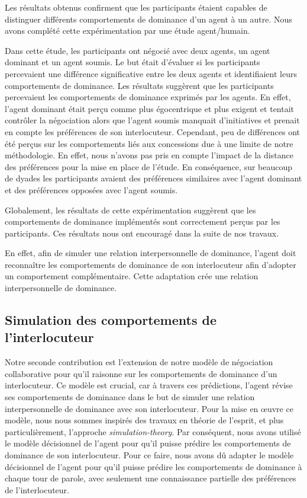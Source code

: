 	Les résultats obtenus confirment que les participants étaient capables de distinguer différents comportements de dominance d'un agent à un autre. Nous avons complété cette expérimentation par une étude agent/humain. 
	
	Dans cette étude, les participants ont négocié avec deux agents, un agent dominant et un agent soumis. Le but était d'évaluer si les participants percevaient une différence significative entre les deux agents et identifiaient leurs comportements de dominance.
	Les résultats suggèrent que les participants percevaient les comportements de dominance exprimés par les agents. En effet, l'agent dominant était perçu comme plus égocentrique et plus exigent et tentait contrôler la négociation alors que l'agent soumis manquait d'initiatives et prenait en compte les préférences de son interlocuteur. Cependant, peu de différences ont été perçus sur les comportements liés aux concessions due à une limite de notre méthodologie. En effet, nous n'avons pas pris en compte l'impact de la distance des préférences pour la mise en place de l'étude. En conséquence, sur beaucoup de dyades les participants avaient des préférences similaires avec l'agent dominant et des préférences opposées avec l'agent soumis. 
	
	Globalement, les résultats de cette expérimentation suggèrent que les comportements de dominance implémentés sont correctement perçus par les participants. Ces résultats nous ont encouragé dans la suite de nos travaux. 
	
	En effet, afin de simuler une relation interpersonnelle de dominance, l'agent doit reconnaître les comportements de dominance de son interlocuteur afin d'adopter un comportement complémentaire. Cette adaptation crée une relation interpersonnelle de dominance.  
	
	\subsection{Simulation des comportements de l'interlocuteur}
	
		Notre seconde contribution est l'extension de notre modèle de négociation collaborative pour qu'il raisonne sur les comportements de dominance d'un interlocuteur. Ce modèle est crucial, car à travers ces prédictions, l'agent révise ses comportements de dominance dans le but de simuler une relation interpersonnelle de dominance avec son interlocuteur. 
		Pour la mise en œuvre ce modèle, nous nous sommes inspirés des travaux en théorie de l'esprit, et plus particulièrement, l'approche \emph{simulation-theory}. Par conséquent, nous avons utilisé le modèle décisionnel de l'agent pour qu'il puisse prédire les comportements de dominance de son interlocuteur. 
		Pour ce faire, nous avons dû adapter le modèle décisionnel de l'agent pour qu'il puisse prédire les comportements de dominance à chaque tour de parole, avec seulement une connaissance partielle des préférences de l'interlocuteur. 
		
